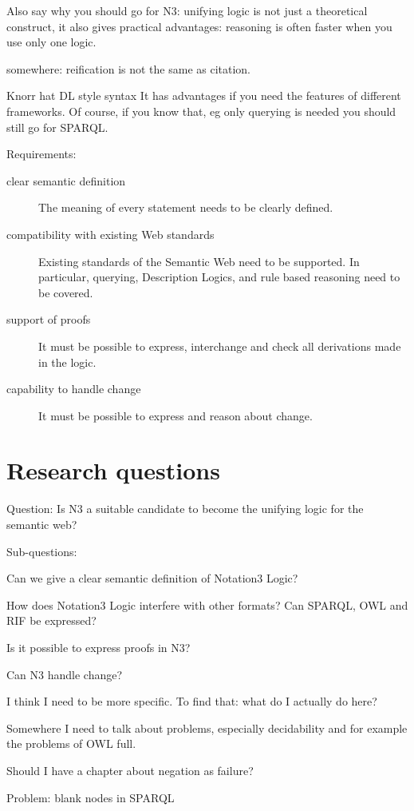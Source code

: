Also say why you should go for N3: unifying logic is not just a theoretical construct, it also gives practical advantages: reasoning is often faster when you use only one logic.  

somewhere: reification is not the same as citation.

Knorr hat DL style syntax
It has advantages if you need 
the features of different frameworks. Of course, if you know that, eg only querying is needed you should still go for SPARQL.


Requirements:
\begin{description}
 \item[clear semantic definition] 
The meaning of every statement needs to be clearly defined.
 \item[compatibility with existing Web standards]  Existing standards of the Semantic Web need to be supported. 
 In particular, querying, Description Logics, and rule based reasoning need to be covered.
 \item[support of proofs] It must be possible to express, interchange and check all derivations made in the logic.
 \item[capability to handle change] It must be possible to express and reason about change.
\end{description}


\section{Research questions}
Question: Is N3 a suitable candidate to become the unifying logic for the semantic web?

Sub-questions:

Can we give a clear semantic definition of Notation3 Logic?

How does Notation3 Logic interfere with other formats? Can SPARQL, OWL and RIF be expressed?

Is it possible to express proofs in N3?

Can N3 handle change?

I think I need to be more specific. To find that: what do I actually do here?



% 
% 



Somewhere I need to talk about problems, especially decidability and for example the problems of OWL full.

Should I have a chapter about negation as failure?

Problem: blank nodes in SPARQL